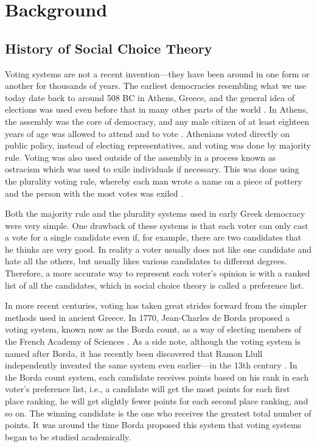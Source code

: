 
\chapter{Background}

\section{History of Social Choice Theory}

	Voting systems are not a recent invention---they have been around in one form or another for thousands of years. The earliest democracies resembling what we use today date back to around 508 BC in Athens, Greece, and the general idea of elections was used even before that in many other parts of the world \cite{democracybritannica}. In Athens, the assembly was the core of democracy, and any male citizen of at least eighteen years of age was allowed to attend and to vote \cite{heinemann1952}. Athenians voted directly on public policy, instead of electing representatives, and voting was done by majority rule. Voting was also used outside of the assembly in a process known as ostracism which was used to exile individuals if necessary. This was done using the plurality voting rule, whereby each man wrote a name on a piece of pottery and the person with the most votes was exiled \cite{oturnbull}.

	Both the majority rule and the plurality systems used in early Greek democracy were very simple. One drawback of these systems is that each voter can only cast a vote for a single candidate even if, for example, there are two candidates that he thinks are very good. In reality a voter usually does not like one candidate and hate all the others, but usually likes various candidates to different degrees. Therefore, a more accurate way to represent each voter's opinion is with a ranked list of all the candidates, which in social choice theory is called a preference list.

	In more recent centuries, voting has taken great strides forward from the simpler methods used in ancient Greece. In 1770, Jean-Charles de Borda proposed a voting system, known now as the Borda count, as a way of electing members of the French Academy of Sciences \cite{borda1781mémoire}. As a side note, although the voting system is named after Borda, it has recently been discovered that Ramon Llull independently invented the same system even earlier---in the 13th century \cite{hägele2001llull}. In the Borda count system, each candidate receives points based on his rank in each voter's preference list, i.e., a candidate will get the most points for each first place ranking, he will get slightly fewer points for each second place ranking, and so on. The winning candidate is the one who receives the greatest total number of points. It was around the time Borda proposed this system that voting systems began to be studied academically.

